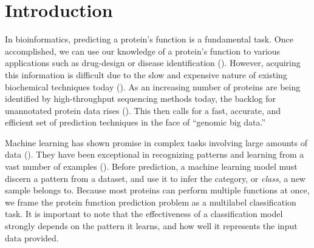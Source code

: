 %
%
%
%
%

\chapter{Introduction}
\label{Introduction}

\par In bioinformatics, predicting a protein's function is a fundamental
task. Once accomplished, we can use our knowledge of a protein's function to
various applications such as drug-design or disease identification
(\cite{baldi2001bioinformatics}). However, acquiring this information is
difficult due to the slow and expensive nature of existing biochemical
techniques today (\cite{cozzetto2017computational}). As an increasing number
of proteins are being identified by high-throughput sequencing methods today,
the backlog for unannotated protein data rises (\cite{gaudet2017gene}). This
then calls for a fast, accurate, and efficient set of prediction techniques
in the face of ``genomic big data.''
  
\par Machine learning has shown promise in complex tasks involving large
amounts of data (\cite{chen2014data}). They have been exceptional in
recognizing patterns and learning from a vast number of examples
(\cite{lecun2015deep}). Before prediction, a machine learning model must
discern a pattern from a dataset, and use it to infer the category, or
\textit{class}, a new sample belongs to. Because most proteins can perform
multiple functions at once, we frame the protein function prediction problem
as a multilabel classification task. It is important to note that the
effectiveness of a classification model strongly depends on the pattern it
learns, and how well it represents the input data provided.

